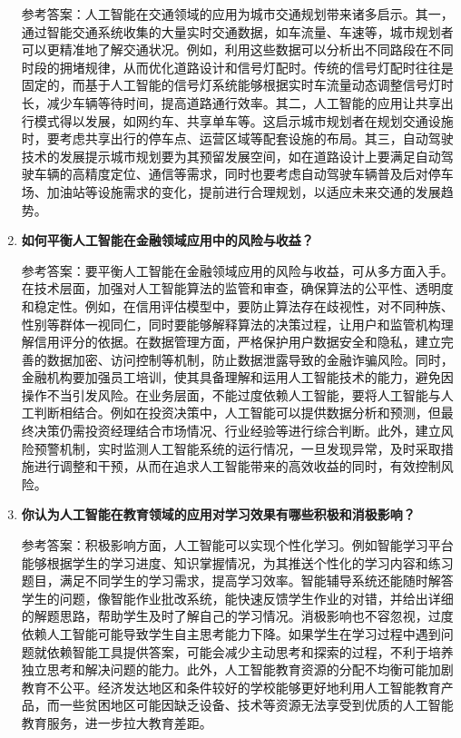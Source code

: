 \begin{enumerate}
参考答案：人工智能在交通领域的应用为城市交通规划带来诸多启示。其一，通过智能交通系统收集的大量实时交通数据，如车流量、车速等，城市规划者可以更精准地了解交通状况。例如，利用这些数据可以分析出不同路段在不同时段的拥堵规律，从而优化道路设计和信号灯配时。传统的信号灯配时往往是固定的，而基于人工智能的信号灯系统能够根据实时车流量动态调整信号灯时长，减少车辆等待时间，提高道路通行效率。其二，人工智能的应用让共享出行模式得以发展，如网约车、共享单车等。这启示城市规划者在规划交通设施时，要考虑共享出行的停车点、运营区域等配套设施的布局。其三，自动驾驶技术的发展提示城市规划要为其预留发展空间，如在道路设计上要满足自动驾驶车辆的高精度定位、通信等需求，同时也要考虑自动驾驶车辆普及后对停车场、加油站等设施需求的变化，提前进行合理规划，以适应未来交通的发展趋势。

\item \textbf{如何平衡人工智能在金融领域应用中的风险与收益？}

参考答案：要平衡人工智能在金融领域应用的风险与收益，可从多方面入手。在技术层面，加强对人工智能算法的监管和审查，确保算法的公平性、透明度和稳定性。例如，在信用评估模型中，要防止算法存在歧视性，对不同种族、性别等群体一视同仁，同时要能够解释算法的决策过程，让用户和监管机构理解信用评分的依据。在数据管理方面，严格保护用户数据安全和隐私，建立完善的数据加密、访问控制等机制，防止数据泄露导致的金融诈骗风险。同时，金融机构要加强员工培训，使其具备理解和运用人工智能技术的能力，避免因操作不当引发风险。在业务层面，不能过度依赖人工智能，要将人工智能与人工判断相结合。例如在投资决策中，人工智能可以提供数据分析和预测，但最终决策仍需投资经理结合市场情况、行业经验等进行综合判断。此外，建立风险预警机制，实时监测人工智能系统的运行情况，一旦发现异常，及时采取措施进行调整和干预，从而在追求人工智能带来的高效收益的同时，有效控制风险。

\item \textbf{你认为人工智能在教育领域的应用对学习效果有哪些积极和消极影响？}

参考答案：积极影响方面，人工智能可以实现个性化学习。例如智能学习平台能够根据学生的学习进度、知识掌握情况，为其推送个性化的学习内容和练习题目，满足不同学生的学习需求，提高学习效率。智能辅导系统还能随时解答学生的问题，像智能作业批改系统，能快速反馈学生作业的对错，并给出详细的解题思路，帮助学生及时了解自己的学习情况。消极影响也不容忽视，过度依赖人工智能可能导致学生自主思考能力下降。如果学生在学习过程中遇到问题就依赖智能工具提供答案，可能会减少主动思考和探索的过程，不利于培养独立思考和解决问题的能力。此外，人工智能教育资源的分配不均衡可能加剧教育不公平。经济发达地区和条件较好的学校能够更好地利用人工智能教育产品，而一些贫困地区可能因缺乏设备、技术等资源无法享受到优质的人工智能教育服务，进一步拉大教育差距。


\end{enumerate}
